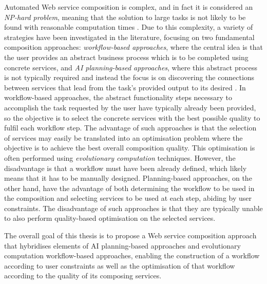 Automated Web service composition is complex, and in fact it is considered an \textit{NP-hard problem}, meaning that the solution to large tasks is not likely to be found with reasonable computation times \cite{moghaddam2014service}. Due to this complexity, a variety of strategies have been investigated in the literature, focusing on two fundamental composition approaches: \textit{workflow-based approaches}, where the central idea is that the user provides an abstract business process which is to be completed using concrete services, and \textit{AI planning-based approaches}, where this abstract process is not typically required and instead the focus is on discovering the connections between services that lead from the task's provided output to its desired \cite{moghaddam2014service}. In workflow-based approaches, the abstract functionality steps necessary to accomplish the task requested by the user have typically already been provided, so the objective is to select the concrete services with the best possible quality to fulfil each workflow step. The advantage of such approaches is that the selection of services may easily be translated into an optimisation problem where the objective is to achieve the best overall composition quality. This optimisation is often performed using \textit{evolutionary computation} techniques. However, the disadvantage is that a workflow must have been already defined, which likely means that it has to be manually designed. Planning-based approaches, on the other hand, have the advantage of both determining the workflow to be used in the composition and selecting services to be used at each step, abiding by user constraints. The disadvantage of such approaches is that they are typically unable to also perform quality-based optimisation on the selected services.

The overall goal of this thesis is to propose a Web service composition approach that hybridises elements of AI planning-based approaches and evolutionary computation workflow-based approaches, enabling the construction of a workflow according to user constraints as well as the optimisation of that workflow according to the quality of its composing services.


